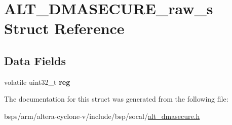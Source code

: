 \hypertarget{structALT__DMASECURE__raw__s}{}\section{A\+L\+T\+\_\+\+D\+M\+A\+S\+E\+C\+U\+R\+E\+\_\+raw\+\_\+s Struct Reference}
\label{structALT__DMASECURE__raw__s}
\subsection*{Data Fields}
\begin{DoxyCompactItemize}
\item 
\mbox{\label{structALT__DMASECURE__raw__s_a7d6c1e8d3a6ba2957d30a84767f7568e}} 
volatile uint32\+\_\+t {\bfseries reg}
\end{DoxyCompactItemize}


The documentation for this struct was generated from the following file\+:\begin{DoxyCompactItemize}
\item 
bsps/arm/altera-\/cyclone-\/v/include/bsp/socal/\mbox{\hyperlink{alt__dmasecure_8h}{alt\+\_\+dmasecure.\+h}}\end{DoxyCompactItemize}

